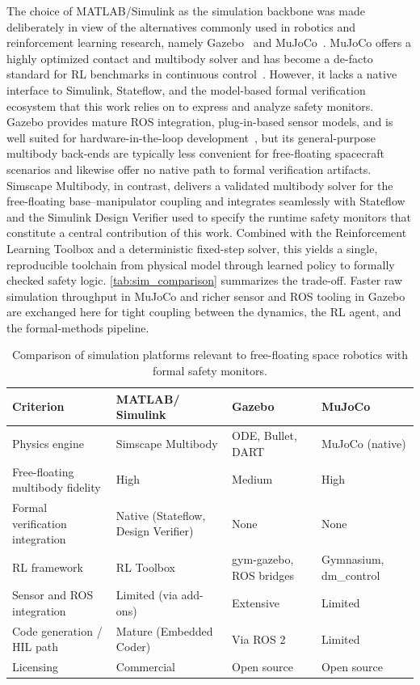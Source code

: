 \documentclass{ieeeaccess}
\begin{document}
The choice of MATLAB/Simulink as the simulation backbone was made deliberately in view of
the alternatives commonly used in robotics and reinforcement learning research, namely Gazebo~\cite{koenig2004gazebo} and MuJoCo~\cite{todorov2012mujoco}.
MuJoCo offers a highly optimized contact and multibody solver and has become a de-facto
standard for RL benchmarks in continuous control~\cite{korber2021comparing}. However, it lacks a native interface to
Simulink, Stateflow, and the model-based formal verification ecosystem that this work relies on to
express and analyze safety monitors. Gazebo provides mature ROS integration, plug-in-based sensor models, and
is well suited for hardware-in-the-loop development~\cite{collins2021review}, but its general-purpose multibody back-ends are typically less
convenient for free-floating spacecraft scenarios and likewise offer no native path to formal verification
artifacts. Simscape Multibody, in contrast, delivers a validated multibody solver for the free-floating base--manipulator
coupling and integrates seamlessly with Stateflow and the Simulink Design Verifier used to specify
the runtime safety monitors that constitute a central contribution of this work. Combined with
the Reinforcement Learning Toolbox and a deterministic fixed-step solver, this yields a single, reproducible
toolchain from physical model through learned policy to formally checked safety logic. \autoref{tab:sim_comparison} summarizes
the trade-off. Faster raw simulation throughput in MuJoCo and richer sensor and ROS tooling
in Gazebo are exchanged here for tight coupling between the dynamics, the RL agent,
and the formal-methods pipeline.

\begin{table}[!t]
\centering
\renewcommand{\arraystretch}{1.25}
\caption{Comparison of simulation platforms relevant to free-floating space robotics with formal safety monitors.}
\label{tab:sim_comparison}
\begin{tabular}{p{2.4cm}p{1.8cm}p{1.5cm}p{1.5cm}}
\toprule
\textbf{Criterion} & \textbf{MATLAB/ Simulink} & \textbf{Gazebo} & \textbf{MuJoCo} \\
\midrule
Physics engine & Simscape Multibody & ODE, Bullet, DART & MuJoCo (native) \\
Free-floating multibody fidelity & High & Medium & High \\
Formal verification integration & Native (Stateflow, Design Verifier) & None & None \\
RL framework & RL Toolbox & gym-gazebo, ROS bridges & Gymnasium, dm\_control \\
Sensor and ROS integration & Limited (via add-ons) & Extensive & Limited \\
Code generation / HIL path & Mature (Embedded Coder) & Via ROS 2 & Limited \\
Licensing & Commercial & Open source & Open source \\
\bottomrule
\end{tabular}
\end{table}
\end{document}

